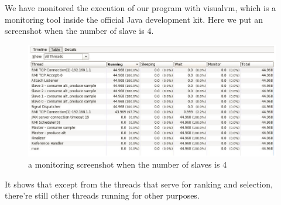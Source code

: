 \documentclass[12pt,a4paper]{report}
\begin{document}
We have monitored the execution of our program with visualvm, which is a monitoring tool inside the official Java development kit. Here we put an screenshot when the number of slave is 4.

\begin{figure}[ht]
\centering
\includegraphics[width=128mm]{monitor.png}
\caption{a monitoring screenshot when the number of slaves is 4}
\end{figure}

It shows that except from the threads that serve for ranking and selection, there're still other threads running for other purposes.

\newpage
%

%
\end{document}
